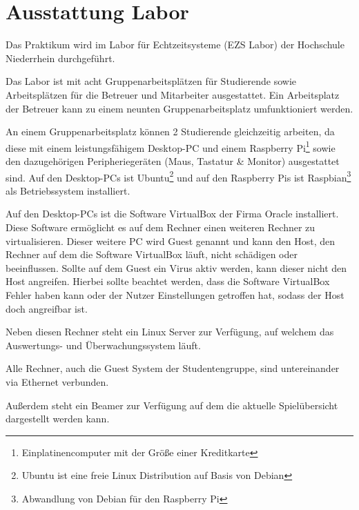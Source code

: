 \section{Ausstattung Labor}
\label{sec:Ausstattung_Labor}

Das Praktikum wird im Labor für Echtzeitsysteme (EZS Labor) der Hochschule Niederrhein durchgeführt.

Das Labor ist mit acht Gruppenarbeitsplätzen für Studierende sowie Arbeitsplätzen für die Betreuer und Mitarbeiter ausgestattet. Ein Arbeitsplatz der Betreuer kann zu einem neunten Gruppenarbeitsplatz umfunktioniert werden.

An einem Gruppenarbeitsplatz können 2 Studierende gleichzeitig arbeiten, da diese mit einem leistungsfähigem Desktop-PC und einem Raspberry Pi\footnote{Einplatinencomputer mit der Größe einer Kreditkarte} sowie den dazugehörigen Peripheriegeräten (Maus, Tastatur \& Monitor) ausgestattet sind.
Auf den Desktop-PCs ist Ubuntu\footnote{Ubuntu ist eine freie Linux Distribution auf Basis von Debian} und auf den Raspberry Pis ist Raspbian\footnote{Abwandlung von Debian für den Raspberry Pi} als Betriebssystem installiert.

Auf den Desktop-PCs ist die Software VirtualBox der Firma Oracle installiert. Diese Software ermöglicht es auf dem Rechner einen weiteren Rechner zu virtualisieren. Dieser weitere PC wird Guest genannt und kann den Host, den Rechner auf dem die Software VirtualBox läuft, nicht schädigen oder beeinflussen. Sollte auf dem Guest ein Virus aktiv werden, kann dieser nicht den Host angreifen. Hierbei sollte beachtet werden, dass die Software VirtualBox Fehler haben kann oder der Nutzer Einstellungen getroffen hat, sodass der Host doch angreifbar ist.

Neben diesen Rechner steht ein Linux Server zur Verfügung, auf welchem das Auswertungs- und Überwachungssystem läuft.

Alle Rechner, auch die Guest System der Studentengruppe, sind untereinander via Ethernet verbunden.

Außerdem steht ein Beamer zur Verfügung auf dem die aktuelle Spielübersicht dargestellt werden kann.